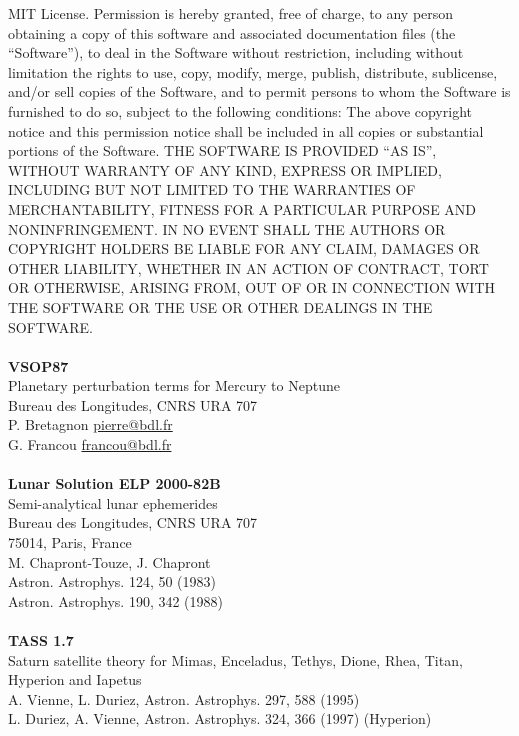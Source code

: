 \documentclass[Orbiter User Manual.tex]{subfiles}
\begin{document}
MIT License. Permission is hereby granted, free of charge, to any person obtaining a copy of this software and associated documentation files (the ``Software''), to deal in the Software without restriction, including without limitation the rights to use, copy, modify, merge, publish, distribute, sublicense, and/or sell copies of the Software, and to permit persons to whom the Software is furnished to do so, subject to the following conditions: The above copyright notice and this permission notice shall be included in all copies or substantial portions of the Software. THE SOFTWARE IS PROVIDED ``AS IS'', WITHOUT WARRANTY OF ANY KIND, EXPRESS OR IMPLIED, INCLUDING BUT NOT LIMITED TO THE WARRANTIES OF MERCHANTABILITY, FITNESS FOR A PARTICULAR PURPOSE AND NONINFRINGEMENT. IN NO EVENT SHALL THE AUTHORS OR COPYRIGHT HOLDERS BE LIABLE FOR ANY CLAIM, DAMAGES OR OTHER LIABILITY, WHETHER IN AN ACTION OF CONTRACT, TORT OR OTHERWISE, ARISING FROM, OUT OF OR IN CONNECTION WITH THE SOFTWARE OR THE USE OR OTHER DEALINGS IN THE SOFTWARE.\\
\\
\textbf{VSOP87}\\
Planetary perturbation terms for Mercury to Neptune\\
Bureau des Longitudes, CNRS URA 707\\
P. Bretagnon \href{mailto:pierre@bdl.fr}{pierre@bdl.fr}\\
G. Francou \href{mailto:francou@bdl.fr}{francou@bdl.fr}\\
\\
\textbf{Lunar Solution ELP 2000-82B}\\
Semi-analytical lunar ephemerides\\
Bureau des Longitudes, CNRS URA 707\\
75014, Paris, France\\
M. Chapront-Touze, J. Chapront\\
Astron. Astrophys. 124, 50 (1983)\\
Astron. Astrophys. 190, 342 (1988)\\
\\
\textbf{TASS 1.7}\\
Saturn satellite theory for Mimas, Enceladus, Tethys, Dione, Rhea, Titan, Hyperion and Iapetus\\
A. Vienne, L. Duriez, Astron. Astrophys. 297, 588 (1995)\\
L. Duriez, A. Vienne, Astron. Astrophys. 324, 366 (1997) (Hyperion)\\
\\
\end{document}

